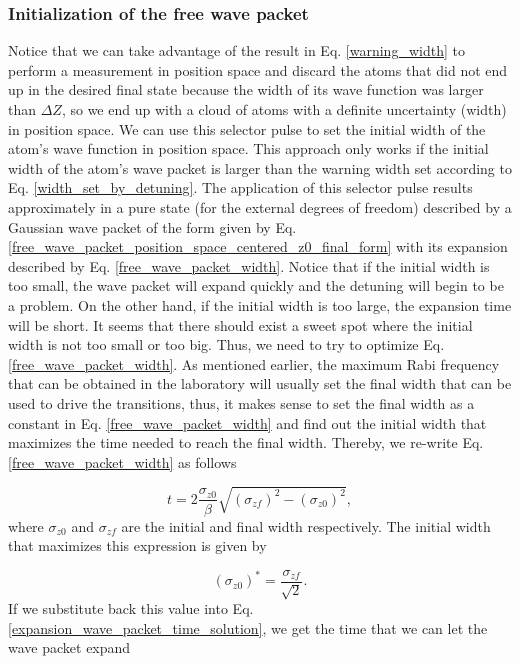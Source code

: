 \documentclass{article}
\begin{document}
\subsubsection{Initialization of the free wave packet}
Notice that we can take advantage of the result in Eq. \ref{warning_width} to perform a measurement in position space and discard the atoms that did not end up in the desired final state because the width of its wave function was larger than $\Delta Z$, so we end up with a cloud of atoms with a definite uncertainty (width) in position space. We can use this selector pulse to set the initial width of the atom's wave function in position space. This approach only works if the initial width of the atom's wave packet is larger than the warning width set according to Eq. \ref{width_set_by_detuning}. The application of this selector pulse results approximately in a pure state (for the external degrees of freedom) described by a Gaussian wave packet of the form given by Eq. \ref{free_wave_packet_position_space_centered_z0_final_form} with its expansion described by Eq. \ref{free_wave_packet_width}. Notice that if the initial width is too small, the wave packet will expand quickly and the detuning will begin to be a problem. On the other hand, if the initial width is too large, the expansion time will be short. It seems that there should exist a sweet spot where the initial width is not too small or too big. Thus, we need to try to optimize Eq. \ref{free_wave_packet_width}. As mentioned earlier, the maximum Rabi frequency that can be obtained in the laboratory will usually set the final width that can be used to drive the transitions, thus, it makes sense to set the final width as a constant in Eq. \ref{free_wave_packet_width} and find out the initial width that maximizes the time needed to reach the final width. Thereby, we re-write Eq. \ref{free_wave_packet_width} as follows

\begin{equation}\label{expansion_wave_packet_time_solution}
    t = 2 \frac{\sigma_{z0}}{\beta} \sqrt{(\sigma_{zf})^2 - (\sigma_{z0})^2},
\end{equation}
%
where $\sigma_{z0}$ and $\sigma_{zf}$ are the initial and final width respectively. The initial width that maximizes this expression is given by

\begin{equation}\label{ratio_optimial_initial_width_vs_final_width_time_max}
    (\sigma_{z0})^{\ast} = \frac{\sigma_{zf}}{\sqrt{2}}.
\end{equation}
%
If we substitute back this value into Eq. \ref{expansion_wave_packet_time_solution}, we get the time that we can let the wave packet expand
\end{document}
